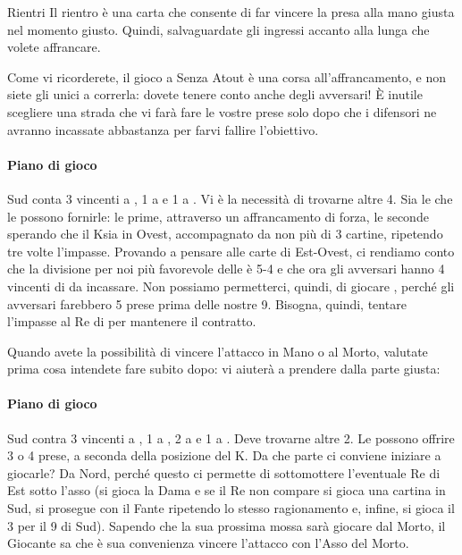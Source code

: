 \documentclass[../corsofiori.tex]{subfiles}
\begin{document}
\medskip
\begin{regola}{Rientri}
    Il rientro è una carta che consente di far vincere la presa alla mano giusta nel momento giusto. Quindi,
    salvaguardate gli ingressi accanto alla lunga che volete affrancare.
\end{regola}
\medskip


Come vi ricorderete, il gioco a Senza Atout è una corsa all'affrancamento, e non siete gli unici a correrla: dovete
tenere conto anche degli avversari! \`E inutile scegliere una strada che vi farà fare le vostre prese solo dopo che
i difensori ne avranno incassate abbastanza per farvi fallire l'obiettivo.

\newgame
{}
\leftupper{\boardtext*}%
{\dealertext\quad}{\vulnertext}

\showAll*

\paragraph{Piano di gioco} Sud conta 3 vincenti a \pic, 1 a \cu e 1 a \qu. Vi è la necessità di trovarne altre 4. Sia le
\fio che le \qu possono fornirle: le prime, attraverso un affrancamento di forza, le seconde sperando che il K\Di sia in
Ovest, accompagnato da non più di 3 cartine, ripetendo tre volte l'impasse.
Provando a pensare alle carte di Est-Ovest, ci rendiamo conto che la divisione per noi più favorevole delle \cu è 5-4
e che ora gli avversari hanno 4 vincenti di \cu da incassare. Non possiamo permetterci, quindi, di giocare \fio, perché
gli avversari farebbero 5 prese prima delle nostre 9. Bisogna, quindi, tentare l'impasse al Re di \qu per mantenere il
contratto.

Quando avete la possibilità di vincere l'attacco in Mano o al Morto, valutate prima cosa intendete fare subito dopo: vi
aiuterà a prendere dalla parte giusta:

\newgame
{}
\leftupper{\boardtext*}%
{\dealertext\quad}{\vulnertext}
\rightlower[2ex]{\lead: 2\Di}{}{}

\showAll*

\paragraph{Piano di gioco} Sud contra 3 vincenti a \pic, 1 a \cu, 2 a \qu e 1 a \fio. Deve trovarne altre 2. Le \fio
possono offrire 3 o 4 prese, a seconda della posizione del K\Cl. Da che parte ci conviene iniziare a giocarle? Da Nord,
perché questo ci permette di sottomottere l'eventuale Re di Est sotto l'asso (si gioca la Dama e se il Re non compare si
gioca una cartina in Sud, si prosegue con il Fante ripetendo lo stesso ragionamento e, infine, si gioca il 3 per il 9 di
Sud). Sapendo che la sua prossima mossa sarà giocare \fio dal Morto, il Giocante sa che è sua convenienza vincere
l'attacco con l'Asso del Morto.
\end{document}
